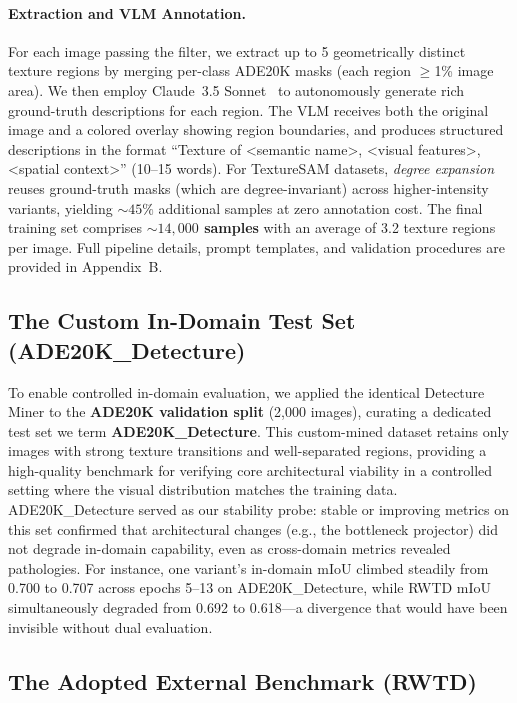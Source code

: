 \documentclass{article}
\begin{document}
\paragraph{Extraction and VLM Annotation.}
For each image passing the filter, we extract up to 5 geometrically distinct texture regions by merging per-class ADE20K masks (each region $\geq$1\% image area). We then employ Claude~3.5 Sonnet~\cite{claude} to autonomously generate rich ground-truth descriptions for each region. The VLM receives both the original image and a colored overlay showing region boundaries, and produces structured descriptions in the format ``Texture of <semantic name>, <visual features>, <spatial context>'' (10--15 words). For TextureSAM datasets, \emph{degree expansion} reuses ground-truth masks (which are degree-invariant) across higher-intensity variants, yielding ${\sim}45\%$ additional samples at zero annotation cost. The final training set comprises \textbf{${\sim}14{,}000$ samples} with an average of 3.2 texture regions per image. Full pipeline details, prompt templates, and validation procedures are provided in Appendix~B.

\subsection{The Custom In-Domain Test Set (ADE20K\_Detecture)}
\label{sec:ade20k_detecture}

To enable controlled in-domain evaluation, we applied the identical Detecture Miner to the \textbf{ADE20K validation split} (2,000 images), curating a dedicated test set we term \textbf{ADE20K\_Detecture}. This custom-mined dataset retains only images with strong texture transitions and well-separated regions, providing a high-quality benchmark for verifying core architectural viability in a controlled setting where the visual distribution matches the training data. ADE20K\_Detecture served as our stability probe: stable or improving metrics on this set confirmed that architectural changes (e.g., the bottleneck projector) did not degrade in-domain capability, even as cross-domain metrics revealed pathologies. For instance, one variant's in-domain mIoU climbed steadily from 0.700 to 0.707 across epochs 5--13 on ADE20K\_Detecture, while RWTD mIoU simultaneously degraded from 0.692 to 0.618---a divergence that would have been invisible without dual evaluation.

\subsection{The Adopted External Benchmark (RWTD)}
\label{sec:rwtd}
\end{document}
